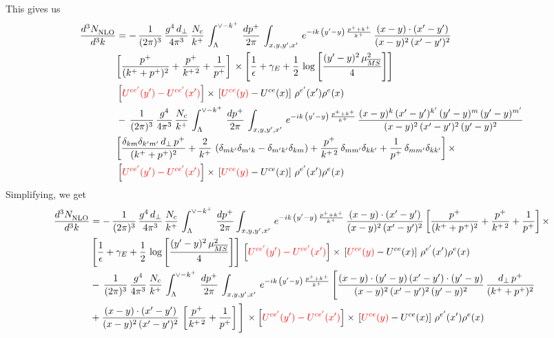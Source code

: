 \documentclass[9pt]{article}
\numberwithin{equation}{section}
\begin{document}
This gives us
\begin{align}
     \frac{d^{3}N_{\rm NLO}^{\rm}}{d^{3}k}  & = -\,\frac{1}{(2\pi)^{3}}\,\frac{g^{4}\,d_{\perp}}{4\pi^{3}}\,\frac{N_{c}}{k^{+}}\,\int_{\Lambda}^{\vee-k^{+}}\, \frac{dp^{+}}{2\pi}\,\int_{x,y,y^{\prime},x'}\,e^{-ik\,\left(y'-y\right)\,\frac{p^{+}+k^{+}}{k^{+}}}\,\frac{(x-y)\cdot (x'-y')}{(x-y)^{2}\,(x'-y')^{2}}\notag \\ &  \bigg[\frac{p^{+}}{(k^{+}+p^{+})^{2}} + \frac{p^{+}}{k^{+\,2}}+\frac{1}{p^{+}}\bigg]\,\times\left[\frac{1}{\epsilon} +\gamma_{E} +\frac{1}{2}\,\log{\left[\frac{(y'-y)^{2}\,\mu^{2}_{\overline{MS}}}{4}\right]}\right]\notag \\ &  \left[{\color{red}U^{ce'}(y') - U^{ce'}(x')}\right] \times\, \left[{\color{red}U^{ce}(y)} - U^{ce}(x)\right]\, \rho^{e'}(x') \rho^{e}(x)\notag \\ & -\,\frac{1}{(2\pi)^{3}}\,\frac{g^{4}}{4\pi^{3}}\,\frac{N_{c}}{k^{+}}\,\int_{\Lambda}^{\vee-k^{+}}\, \frac{dp^{+}}{2\pi}\,\int_{x,y,y^{\prime},x'}\,e^{-ik\,\left(y'-y\right)\,\frac{p^{+}+k^{+}}{k^{+}}}\,\frac{(x-y)^{k}\,(x'-y')^{k'}\,(y'-y)^{m}\,(y'-y)^{m'}}{(x-y)^{2}\,(x'-y')^{2}\,(y'-y)^{2}}\notag \\ &  \bigg[\frac{\delta_{km}\delta_{k'm'}\,d_{\perp}\,p^{+}}{(k^{+}+p^{+})^{2}}+\frac{2}{k^{+}}\,\left(\delta_{mk'}\delta_{m'k}-\delta_{m'k'}\delta_{km}\right) + \frac{p^{+}}{k^{+\,2}}\,\delta_{mm'}\delta_{kk'}+\frac{1}{p^{+}}\,\delta_{mm'}\delta_{kk'}\bigg]\,\times\notag \\ &  \left[{\color{red}U^{ce'}(y') - U^{ce'}(x')}\right] \times\, \left[{\color{red}U^{ce}(y)} - U^{ce}(x)\right]\, \rho^{e'}(x') \rho^{e}(x)
\end{align}
Simplifying, we get
\begin{align}
     \frac{d^{3}N_{\rm NLO}^{\rm}}{d^{3}k}  & = -\,\frac{1}{(2\pi)^{3}}\,\frac{g^{4}\,d_{\perp}}{4\pi^{3}}\,\frac{N_{c}}{k^{+}}\,\int_{\Lambda}^{\vee-k^{+}}\, \frac{dp^{+}}{2\pi}\int_{x,y,y^{\prime},x'}\,e^{-ik\,\left(y'-y\right)\,\frac{p^{+}+k^{+}}{k^{+}}}\,\frac{(x-y)\cdot (x'-y')}{(x-y)^{2}\,(x'-y')^{2}}\,\bigg[\frac{p^{+}}{(k^{+}+p^{+})^{2}} + \frac{p^{+}}{k^{+\,2}}+\frac{1}{p^{+}}\bigg]\,\times\notag \\ & \left[\frac{1}{\epsilon} +\gamma_{E} +\frac{1}{2}\,\log{\left[\frac{(y'-y)^{2}\,\mu^{2}_{\overline{MS}}}{4}\right]}\right]\,\left[{\color{red}U^{ce'}(y') - U^{ce'}(x')}\right] \times\, \left[{\color{red}U^{ce}(y)} - U^{ce}(x)\right]\, \rho^{e'}(x') \rho^{e}(x)\notag \\ & -\,\frac{1}{(2\pi)^{3}}\,\frac{g^{4}}{4\pi^{3}}\,\frac{N_{c}}{k^{+}}\,\int_{\Lambda}^{\vee-k^{+}}\, \frac{dp^{+}}{2\pi}\,\int_{x,y,y^{\prime},x'}\,e^{-ik\,\left(y'-y\right)\,\frac{p^{+}+k^{+}}{k^{+}}}\,\Bigg[\frac{(x-y)\cdot (y'-y)\, (x'-y')\cdot (y'-y)}{(x-y)^{2}\,(x'-y')^{2}\,(y'-y)^{2}}\,\frac{d_{\perp}\,p^{+}}{(k^{+}+p^{+})^{2}}\notag \\ & + \frac{(x-y)\cdot (x'-y')}{(x-y)^{2}\,(x'-y')^{2}}\,\left[\frac{p^{+}}{k^{+\,2}} + \frac{1}{p^{+}}\right]\Bigg]\,\times \left[{\color{red}U^{ce'}(y') - U^{ce'}(x')}\right] \times\, \left[{\color{red}U^{ce}(y)} - U^{ce}(x)\right]\, \rho^{e'}(x') \rho^{e}(x)
\end{align}
\end{document}
